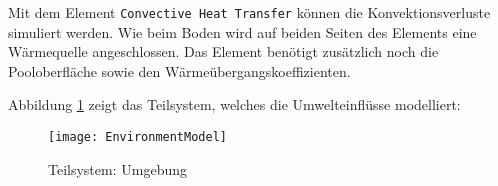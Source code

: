 Mit dem Element \texttt{Convective Heat Transfer} können die Konvektionsverluste simuliert werden. Wie beim Boden wird auf beiden Seiten des Elements eine Wärmequelle angeschlossen. Das Element benötigt zusätzlich noch die Pooloberfläche sowie den Wärmeübergangskoeffizienten.

Abbildung \ref{fig:EnvironmentModel} zeigt das Teilsystem, welches die Umwelteinflüsse modelliert:

\begin{figure}[H]
	\centering
	\texttt{[image: EnvironmentModel]}
	\caption{Teilsystem: Umgebung}
	\label{fig:EnvironmentModel}
\end{figure}
